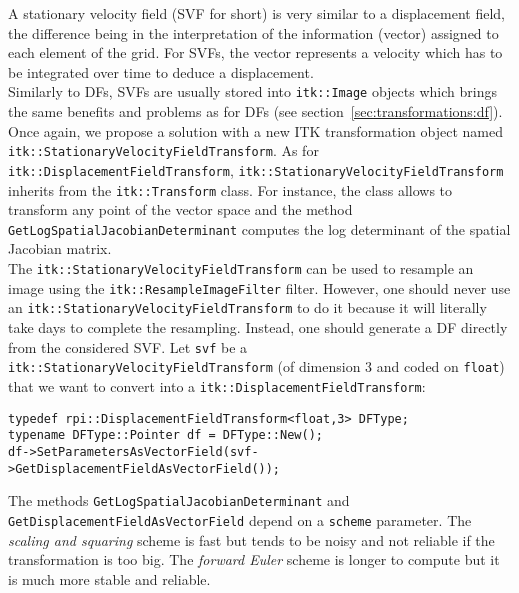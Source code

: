 A stationary velocity field (SVF for short) is very similar to a displacement field, the difference being in the interpretation of the information (vector) assigned to each element of the grid. For SVFs, the vector represents a velocity which has to be integrated over time to deduce a displacement.
\\
Similarly to DFs, SVFs are usually stored into \texttt{itk::Image} objects which brings the same benefits and problems as for DFs (see section~\ref{sec:transformations:df}). Once again, we propose a solution with a new ITK transformation object named \texttt{itk::\-Stationary\-Velocity\-Field\-Transform}. As for \texttt{itk::\-Displacement\-Field\-Transform}, \texttt{itk::\-Stationary\-Velocity\-Field\-Transform} inherits from the \texttt{itk::Transform} class. For instance, the class allows to transform any point of the vector space and the method \texttt{GetLogSpatialJacobianDeterminant} computes the log determinant of the spatial Jacobian matrix.
\\
The \texttt{itk::\-Stationary\-Velocity\-Field\-Transform} can be used to resample an image using the \texttt{itk::ResampleImageFilter} filter. However, one should never use an \texttt{itk::\-Stationary\-Velocity\-Field\-Transform} to do it because it will literally take days to complete the resampling. Instead, one should generate a DF directly from the considered SVF. Let \texttt{svf} be a \texttt{itk::\-Stationary\-Velocity\-Field\-Transform} (of dimension 3 and coded on \texttt{float}) that we want to convert into a \texttt{itk::\-Displacement\-Field\-Transform}:
%
\begin{lstlisting}
typedef rpi::DisplacementFieldTransform<float,3> DFType;
typename DFType::Pointer df = DFType::New();
df->SetParametersAsVectorField(svf->GetDisplacementFieldAsVectorField());
\end{lstlisting}
%
The methods \texttt{GetLogSpatialJacobianDeterminant} and \texttt{GetDisplacementFieldAsVectorField} depend on a \texttt{scheme} parameter. The \textit{scaling and squaring} scheme is fast but tends to be noisy and not reliable if the transformation is too big. The \textit{forward Euler} scheme is longer to compute but it is much more stable and reliable.
















